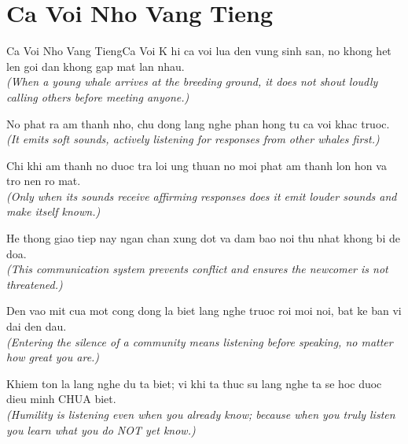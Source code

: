 \section{Ca Voi Nho Vang Tieng}
\begin{truyen}{Ca Voi Nho Vang Tieng}{Ca Voi}
K hi ca voi lua den vung sinh san, no khong het len goi dan khong gap mat lan nhau.\\
\textit{(When a young whale arrives at the breeding ground, it does not shout loudly calling others before meeting anyone.)}

No phat ra am thanh nho, chu dong lang nghe phan hong tu ca voi khac truoc.\\
\textit{(It emits soft sounds, actively listening for responses from other whales first.)}

Chi khi am thanh no duoc tra loi ung thuan no moi phat am thanh lon hon va tro nen ro mat.\\
\textit{(Only when its sounds receive affirming responses does it emit louder sounds and make itself known.)}

He thong giao tiep nay ngan chan xung dot va dam bao noi thu nhat khong bi de doa.\\
\textit{(This communication system prevents conflict and ensures the newcomer is not threatened.)}

Den vao mit cua mot cong dong la biet lang nghe truoc roi moi noi, bat ke ban vi dai den dau.\\
\textit{(Entering the silence of a community means listening before speaking, no matter how great you are.)}

\end{truyen}
\begin{baihoc}
  Khiem ton la lang nghe du ta biet; vi khi ta thuc su lang nghe ta se hoc duoc dieu minh CHUA biet.\\
  \textit{(Humility is listening even when you already know; because when you truly listen you learn what you do NOT yet know.)}
\end{baihoc}

